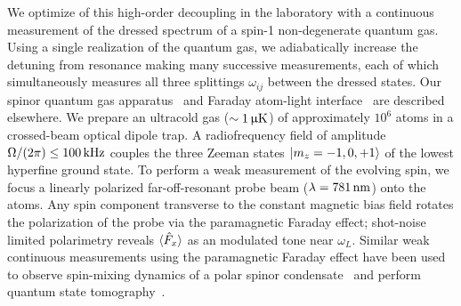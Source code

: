 \documentclass[aps,prl,reprint,superscriptaddress,floatfix]{revtex4-1}
\begin{document}
We optimize of this high-order decoupling in the laboratory with a continuous measurement of the dressed spectrum of a spin-1 non-degenerate quantum gas.
Using a single realization of the quantum gas, we adiabatically increase the detuning from resonance making many successive measurements, each of which simultaneously measures all three splittings $\omega_{ij}$ between the dressed states.
Our spinor quantum gas apparatus~\cite{wood_magnetic_2015} and Faraday atom-light interface~\cite{jasperse_magic-wavelength_2017} are described elsewhere.
We prepare an ultracold gas ($\sim \unit[1]{\upmu K}$) of approximately $10^6$ \Rb atoms in a crossed-beam optical dipole trap.
A radiofrequency field of amplitude $\Omega/(2\pi) \leq \unit[100]{kHz}$ couples the three Zeeman states $\vert m_z=-1,0,+1 \rangle $ of the lowest hyperfine ground state.
To perform a weak measurement of the evolving spin, we focus a linearly polarized far-off-resonant probe beam ($\lambda=\unit[781]{nm}$) onto the atoms.
Any spin component transverse to the constant magnetic bias field rotates the polarization of the probe via the paramagnetic Faraday effect; shot-noise limited polarimetry reveals $\langle \hat{F}_x \rangle$ as an modulated tone near $\omega_L$.
Similar weak continuous measurements using the paramagnetic Faraday effect have been used to observe spin-mixing dynamics of a polar spinor condensate~\cite{liu_quantum_2009} and perform quantum state tomography~\cite{smith_continuous_2004,*smith_efficient_2006}.
\end{document}
